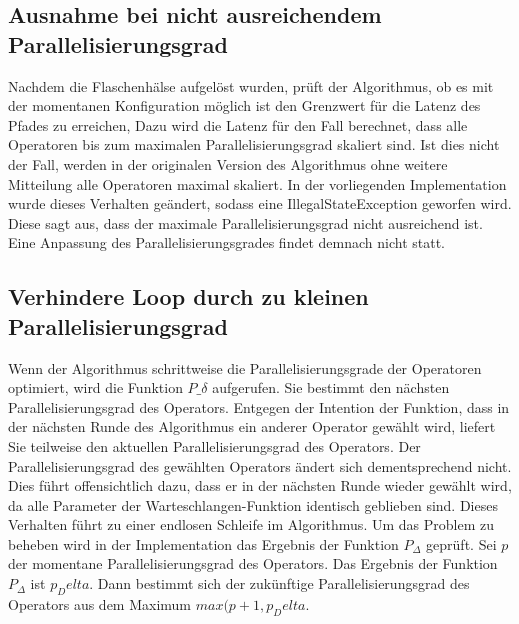 \subsection{Ausnahme bei nicht ausreichendem Parallelisierungsgrad}
Nachdem die Flaschenhälse aufgelöst wurden, prüft der Algorithmus, ob es mit der momentanen Konfiguration möglich ist den Grenzwert für die Latenz des Pfades zu erreichen,
Dazu wird die Latenz für den Fall berechnet, dass alle Operatoren bis zum maximalen Parallelisierungsgrad skaliert sind. Ist dies nicht der Fall, werden in der originalen Version des Algorithmus ohne weitere Mitteilung alle Operatoren maximal skaliert. In der vorliegenden Implementation wurde dieses Verhalten geändert, sodass eine IllegalStateException geworfen wird. Diese sagt aus, dass der maximale Parallelisierungsgrad nicht ausreichend ist. Eine Anpassung des Parallelisierungsgrades findet demnach nicht statt.

\subsection{Verhindere Loop durch zu kleinen Parallelisierungsgrad}
Wenn der Algorithmus schrittweise die Parallelisierungsgrade der Operatoren optimiert, wird die Funktion \(P\_\delta\) aufgerufen.
Sie bestimmt den nächsten Parallelisierungsgrad des Operators.
Entgegen der Intention der Funktion, dass in der nächsten Runde des Algorithmus ein anderer Operator gewählt wird, liefert Sie teilweise den aktuellen Parallelisierungsgrad des Operators.
Der Parallelisierungsgrad des gewählten Operators ändert sich dementsprechend nicht.
Dies führt offensichtlich dazu, dass er in der nächsten Runde wieder gewählt wird, da alle Parameter der Warteschlangen-Funktion identisch geblieben sind.
Dieses Verhalten führt zu einer endlosen Schleife im Algorithmus.
Um das Problem zu beheben wird in der Implementation das Ergebnis der Funktion \(P_\Delta\) geprüft.
Sei \(p\) der momentane Parallelisierungsgrad des Operators.
Das Ergebnis der Funktion \(P_\Delta\) ist \(p_Delta\).
Dann bestimmt sich der zukünftige Parallelisierungsgrad des Operators aus dem Maximum \(max(p+1, p_Delta\).

